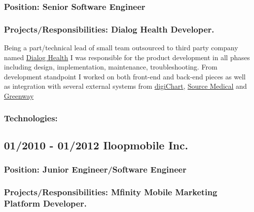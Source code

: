 \documentclass[a4paper]{article}
\begin{document}
\subsubsection*{Position:  \textcolor[RGB]{140,140,140} { Senior Software Engineer} }

\subsubsection*{Projects/Responsibilities: Dialog Health Developer.} 

Being a part/technical lead of small team outsourced to third party company named \href{http://www.dialoghealth.com/}{Dialog Health} I was responsible for the product development in all phases including design, implementation, maintenance, troubleshooting. From development standpoint I worked on both front-end and back-end pieces as well as integration with several external systems from \href{http://www.digichart.com/}{digiChart}, \href{http://sourcemed.net/}{Source Medical} and \href{http://www.greenwayhealth.com/}{Greenway} 

\subsubsection*{Technologies:} 



\subsection*{01/2010 - 01/2012 Iloopmobile Inc.}

\subsubsection*{Position:  \textcolor[RGB]{140,140,140} {Junior Engineer/Software Engineer} }

\subsubsection*{Projects/Responsibilities: Mfinity Mobile Marketing Platform Developer.} 

\end{document}
